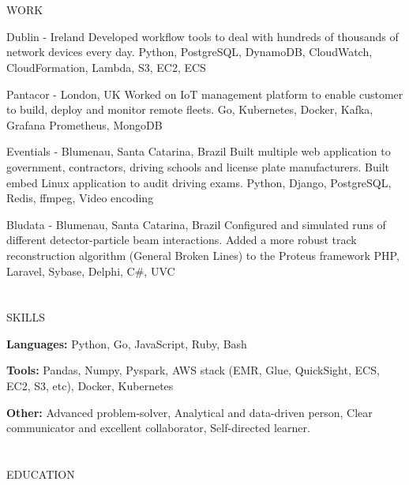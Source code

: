 \documentclass{my_cv}
\begin{document}
\begin{multicols}{2}
\section{\faPencil}{WORK}

%
    {Dublin - Ireland}%
    {Developed workflow tools to deal with hundreds of thousands of network devices every day.}
    {Python, PostgreSQL, DynamoDB, CloudWatch, CloudFormation, Lambda, S3, EC2, ECS}

%
    {Pantacor - London, UK}%
    {Worked on IoT management platform to enable customer to build, deploy and monitor remote fleets.}%
    {Go, Kubernetes, Docker, Kafka, Grafana Prometheus, MongoDB}

%
    {Eventials - Blumenau, Santa Catarina, Brazil}%
    {Built multiple web application to government, contractors, driving schools and license plate manufacturers. Built embed Linux application to audit driving exams.}%
    {Python, Django, PostgreSQL, Redis, ffmpeg, Video encoding}

%
    {Bludata - Blumenau, Santa Catarina, Brazil}%
    {Configured and simulated runs of different detector-particle beam interactions. Added a more robust track reconstruction algorithm (General Broken Lines) to the Proteus framework}
    {PHP, Laravel, Sybase, Delphi, C\#, UVC}%

\section{\faList}{SKILLS}

\textbf{Languages:} Python, Go, JavaScript, Ruby, Bash

\noindent\textbf{Tools:} Pandas, Numpy, Pyspark, AWS stack (EMR, Glue, QuickSight, ECS, EC2, S3, etc), Docker, Kubernetes

\noindent\textbf{Other:} Advanced problem-solver, Analytical and data-driven person, Clear communicator and excellent collaborator, Self-directed learner.

\columnbreak

\section{\faGraduationCap}{EDUCATION}


\end{multicols}
\end{document}
